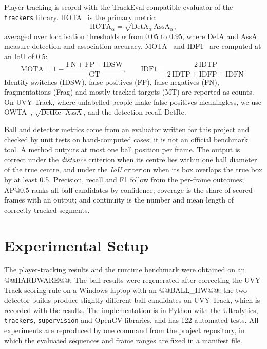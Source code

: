 Player tracking is scored with the TrackEval-compatible evaluator of the
\texttt{trackers} library. HOTA~\cite{hota} is the primary metric:
\begin{equation}
\mathrm{HOTA}_{\alpha}=\sqrt{\mathrm{DetA}_{\alpha}\,\mathrm{AssA}_{\alpha}},
\label{eq:hota}
\end{equation}
averaged over localisation thresholds $\alpha$ from 0.05 to 0.95, where DetA and
AssA measure detection and association accuracy. MOTA~\cite{clear} and
IDF1~\cite{idf1} are computed at an IoU of 0.5:
\begin{equation}
\mathrm{MOTA}=1-\frac{\mathrm{FN}+\mathrm{FP}+\mathrm{IDSW}}{\mathrm{GT}},\qquad
\mathrm{IDF1}=\frac{2\,\mathrm{IDTP}}{2\,\mathrm{IDTP}+\mathrm{IDFP}+\mathrm{IDFN}}.
\label{eq:mota}
\end{equation}
Identity switches (IDSW), false positives (FP), false negatives (FN),
fragmentations (Frag) and mostly tracked targets (MT) are reported as counts. On
UVY-Track, where unlabelled people make false positives meaningless, we use
OWTA~\cite{owta}, $\sqrt{\mathrm{DetRe}\cdot\mathrm{AssA}}$, and the detection
recall DetRe.

Ball and detector metrics come from an evaluator written for this project and
checked by unit tests on hand-computed cases; it is not an official benchmark
tool. A method outputs at most one ball position per frame. The output is
correct under the \emph{distance} criterion when its centre lies within one ball
diameter of the true centre, and under the \emph{IoU} criterion when its box
overlaps the true box by at least 0.5. Precision, recall and F1 follow from the
per-frame outcomes; AP@0.5 ranks all ball candidates by confidence; coverage is
the share of scored frames with an output; and continuity is the number and
mean length of correctly tracked segments.

\section{Experimental Setup}
The player-tracking results and the runtime benchmark were obtained on an
@@HARDWARE@@. The ball results were regenerated after correcting the UVY-Track
scoring rule on a Windows laptop with an @@BALL_HW@@; the two detector builds
produce slightly different ball candidates on UVY-Track, which is recorded with
the results. The implementation is in Python with the Ultralytics, \texttt{trackers},
\texttt{supervision} and OpenCV libraries, and has 122 automated tests. All
experiments are reproduced by one command from the project repository, in which
the evaluated sequences and frame ranges are fixed in a manifest file.

